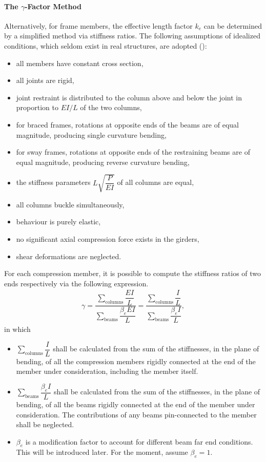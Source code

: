 \paragraph{The $\gamma$-Factor Method}
Alternatively, for frame members, the effective length factor $k_e$ can be determined by a simplified method via stiffness ratios.
The following assumptions of idealized conditions, which seldom exist in real structures, are adopted ():
\begin{itemize}
\item all members have constant cross section,
\item all joints are rigid,
\item joint restraint is distributed to the column above and below the joint in proportion to $EI/L$ of the two columns,
\item for braced frames, rotations at opposite ends of the beams are of equal magnitude, producing single curvature bending,
\item for sway frames, rotations at opposite ends of the restraining beams are of equal magnitude, producing reverse curvature bending,
\item the stiffness parameters $L\sqrt{\dfrac{P}{EI}}$ of all columns are equal,
\item all columns buckle simultaneously,
\item behaviour is purely elastic,
\item no significant axial compression force exists in the girders,
\item shear deformations are neglected.
\end{itemize}

For each compression member, it is possible to compute the stiffness ratios of two ends respectively via the following expression.
\begin{gather}\label{eq:be}
\gamma=\dfrac{\displaystyle\sum_{\text{columns}}\dfrac{EI}{L}}{\displaystyle\sum_{\text{beams}}\dfrac{\beta_eEI}{L}}=\dfrac{\displaystyle\sum_{\text{columns}}\dfrac{I}{L}}{\displaystyle\sum_{\text{beams}}\dfrac{\beta_eI}{L}},
\end{gather}
in which
\begin{itemize}
\item {} $\displaystyle\sum_{\text{columns}}\dfrac{I}{L}$ shall be calculated from the sum of the stiffnesses, in the plane of bending, of all the compression members rigidly connected at the end of the member under consideration, including the member itself.
\item {} $\displaystyle\sum_{\text{beams}}\dfrac{\beta_eI}{L}$ shall be calculated from the sum of the stiffnesses, in the plane of bending, of all the beams rigidly connected at the end of the member under consideration.
The contributions of any beams pin-connected to the member shall be neglected.
\item $\beta_e$ is a modification factor to account for different beam far end conditions.
This will be introduced later.
For the moment, assume $\beta_e=1$.
\end{itemize}

